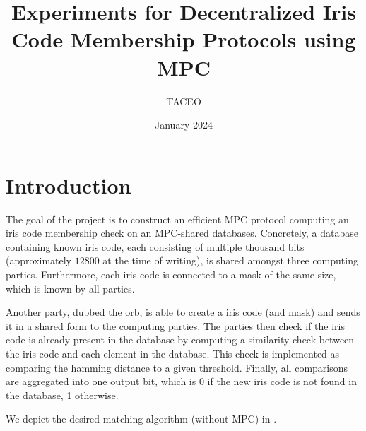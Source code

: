 \documentclass[a4paper,11pt,
]{article}
\begin{document}
\title{Experiments for Decentralized Iris Code Membership Protocols using MPC}


\date{January 2024}

\author{TACEO}

\maketitle


\section{Introduction}

The goal of the project is to construct an efficient MPC protocol computing an iris code membership check on an MPC-shared databases. Concretely, a database containing known iris code, each consisting of multiple thousand bits (approximately $12800$ at the time of writing), is shared amongst three computing parties. Furthermore, each iris code is connected to a mask of the same size, which is known by all parties.

Another party, dubbed the orb, is able to create a iris code (and mask) and sends it in a shared form to the computing parties. The parties then check if the iris code is already present in the database by computing a similarity check between the iris code and each element in the database. This check is implemented as comparing the hamming distance to a given threshold. Finally, all comparisons are aggregated into one output bit, which is 0 if the new iris code is not found in the database, 1 otherwise.

We depict the desired matching algorithm (without MPC) in .
\end{document}
